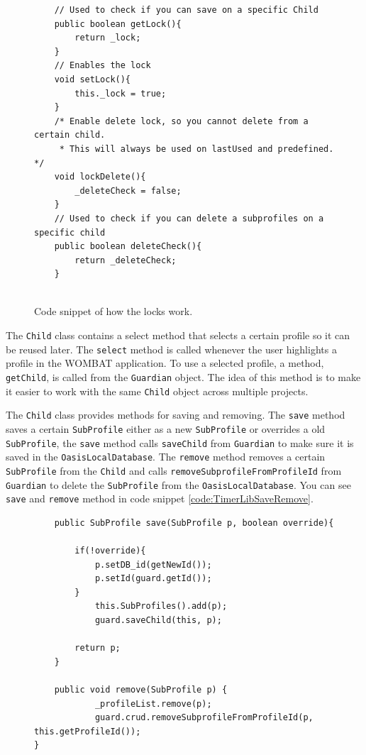 \begin{description}
		\begin{figure}[H]
\begin{lstlisting}
	// Used to check if you can save on a specific Child
	public boolean getLock(){
		return _lock;
	}
	// Enables the lock
	void setLock(){
		this._lock = true;
	}
	/* Enable delete lock, so you cannot delete from a certain child.
	 * This will always be used on lastUsed and predefined. */
	void lockDelete(){
		_deleteCheck = false;
	}
	// Used to check if you can delete a subprofiles on a specific child
	public boolean deleteCheck(){
		return _deleteCheck;
	}
	
\end{lstlisting}
\caption{Code snippet of how the locks work.}%
\label{code:TimerLibLocks}%
\end{figure}
	
The \texttt{Child} class contains a select method that selects a certain profile so it can be reused later. The \texttt{select} method is called whenever the user highlights a profile in the WOMBAT application. To use a selected profile, a method, \texttt{getChild}, is called from the \texttt{Guardian} object. The idea of this method is to make it easier to work with the same \texttt{Child} object across multiple projects.

The \texttt{Child} class provides methods for saving and removing. The \texttt{save} method saves a certain \texttt{SubProfile} either as a new \texttt{SubProfile} or overrides a old \texttt{SubProfile}, the \texttt{save} method calls \texttt{saveChild} from \texttt{Guardian} to make sure it is saved in the \texttt{OasisLocalDatabase}. The \texttt{remove} method removes a certain \texttt{SubProfile} from the \texttt{Child} and calls \texttt{removeSubprofileFromProfileId} from \texttt{Guardian} to delete the \texttt{SubProfile} from the \texttt{OasisLocalDatabase}. You can see \texttt{save} and \texttt{remove} method in code snippet \ref{code:TimerLibSaveRemove}. 
	
			\begin{figure}[H]
\begin{lstlisting}
	public SubProfile save(SubProfile p, boolean override){

		if(!override){
			p.setDB_id(getNewId());
			p.setId(guard.getId());
		}
			this.SubProfiles().add(p);
			guard.saveChild(this, p);
			
		return p;
	}

	public void remove(SubProfile p) {
			_profileList.remove(p);
			guard.crud.removeSubprofileFromProfileId(p, this.getProfileId());
}
	

\end{lstlisting}
\end{figure}
\end{description}

